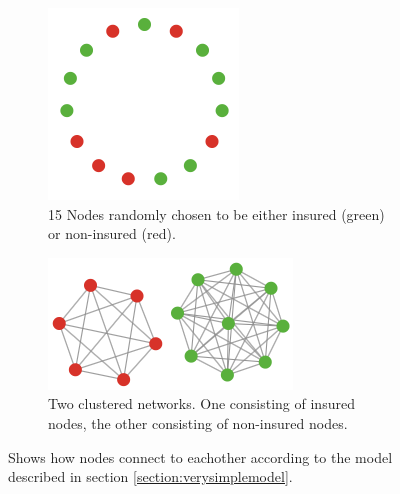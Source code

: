 \begin{figure}[h]
\centering
\begin{subfigure}{.6\textwidth}
  \centering
  \includegraphics[width=0.6\linewidth]{../Figures/firstModelWithNoParameters1.png}
  \caption{\label{fig:firstmod1} 15 Nodes randomly chosen to be either insured (green) or non-insured (red).}
\end{subfigure}
\quad
\begin{subfigure}{.6\textwidth}
  \centering
  \includegraphics[width=1.0\linewidth]{../Figures/firstModelWithNoParameters2.png}
  \caption{\label{fig:firstmod2} Two clustered networks. One consisting of insured nodes, the other consisting of non-insured nodes.}
\end{subfigure}
\caption{\label{fig:firstmodfinal} Shows how nodes connect to eachother according to the model described in section \ref{section:verysimplemodel}.}
\end{figure}
 
